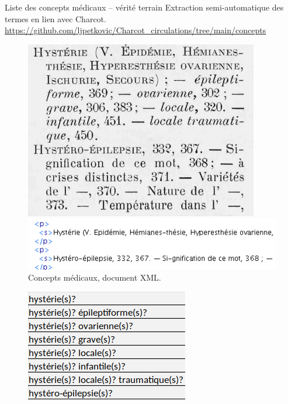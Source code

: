\begin{frame}{Liste des concepts médicaux -- vérité terrain}
	Extraction semi-automatique des termes en lien avec Charcot.\\{\scriptsize\url{https://github.com/ljpetkovic/Charcot\_circulations/tree/main/concepts}}
	
	\begin{figure}[!htb]
		\centering
		\begin{minipage}{.5\textwidth}
			\centering
			\includegraphics[width=0.6\linewidth, height=0.3\textheight]{pic/concepts-pdf}
			\caption{Index des termes \parencite{charcot1892oeuvres}.}
			\label{fig:prob1_6_2}
		\end{minipage}%
		\begin{minipage}{.5\textwidth}
			\centering
			\includegraphics[width=1\linewidth, height=0.15\textheight]{pic/concepts-xml}
			\caption{Concepts médicaux, document XML.}
			\label{fig:prob1_6_1}
		\end{minipage}
	\end{figure}
	\begin{figure}[!htb]
		\centering
		\begin{minipage}{.5\textwidth}
			\centering
			\includegraphics[width=0.6\linewidth, height=0.25\textheight]{pic/concepts-csv}

\end{minipage}
\end{figure}
\end{frame}
